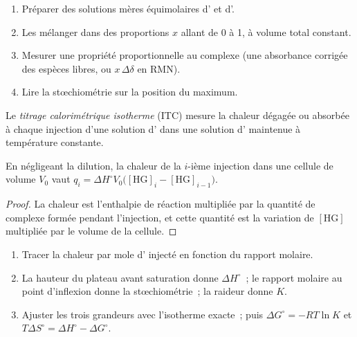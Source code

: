 \begin{method}\label{met:b3:supramolecular:job}
\begin{enumerate}
  \item Préparer des solutions mères équimolaires d' et d'.
  \item Les mélanger dans des proportions $x$ allant de 0 à 1, à volume
        total constant.
  \item Mesurer une propriété proportionnelle au complexe (une absorbance
        corrigée des espèces libres, ou $x\,\Delta\delta$ en RMN).
  \item Lire la stœchiométrie sur la position du maximum.
\end{enumerate}
\end{method}

\begin{definition}\label{def:b3:supramolecular:itc}
Le \emph{titrage calorimétrique isotherme}
(ITC) mesure la chaleur dégagée ou absorbée à chaque injection d'une
solution d' dans une solution d' maintenue à température
constante.
\end{definition}

\begin{proposition}\label{prop:b3:supramolecular:itc}
En négligeant la dilution, la chaleur de la $i$-ième injection dans une cellule de volume $V_0$ vaut
$q_i = \Delta H^\circ V_0\bigl([\mathrm{HG}]_i - [\mathrm{HG}]_{i-1}\bigr)$.
\end{proposition}

\begin{proof}
La chaleur est l'enthalpie de réaction multipliée par la quantité de
complexe formée pendant l'injection, et cette quantité est la variation de $[\mathrm{HG}]$ multipliée par le volume de la cellule.
\end{proof}

\begin{method}\label{met:b3:supramolecular:itc}
\begin{enumerate}
  \item Tracer la chaleur par mole d' injecté en fonction du rapport
        molaire.
  \item La hauteur du plateau avant saturation donne $\Delta H^\circ$~; le rapport molaire au
        point d'inflexion donne la stœchiométrie~; la raideur donne $K$.
  \item Ajuster les trois grandeurs avec l'isotherme exacte~; puis $\Delta G^\circ = -RT\ln K$ et
        $T\Delta S^\circ = \Delta H^\circ - \Delta G^\circ$.
\end{enumerate}
\end{method}

